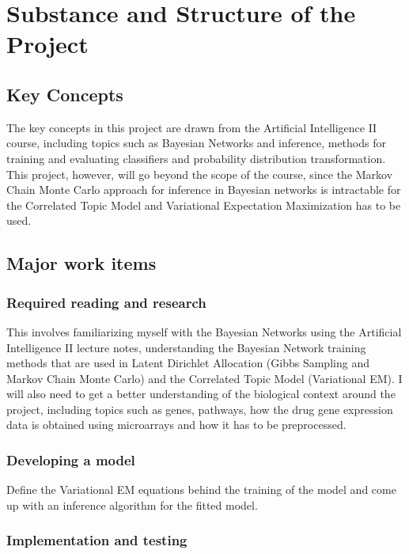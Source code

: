 \documentclass[12pt,a4]{article}
\begin{document}
\section*{Substance and Structure of the Project}

\subsection*{Key Concepts}

The key concepts in this project are drawn from the Artificial Intelligence II course, including topics such as Bayesian Networks and inference, methods for training and evaluating classifiers and probability distribution transformation. This project, however, will go beyond the scope of the course, since the Markov Chain Monte Carlo approach for inference in Bayesian networks is intractable for the Correlated Topic Model and Variational Expectation Maximization has to be used.

\subsection*{Major work items}

\subsubsection*{Required reading and research}
This involves familiarizing myself with the Bayesian Networks using the Artificial Intelligence II lecture notes, understanding the Bayesian Network training methods that are used in Latent Dirichlet Allocation (Gibbs Sampling and Markov Chain Monte Carlo) and the Correlated Topic Model (Variational EM). I will also need to get a better understanding of the biological context around the project, including topics such as genes, pathways, how the drug gene expression data is obtained using microarrays and how it has to be preprocessed.

\subsubsection*{Developing a model}

Define the Variational EM equations behind the training of the model and come up with an inference algorithm for the fitted model.

\subsubsection*{Implementation and testing}
\end{document}
